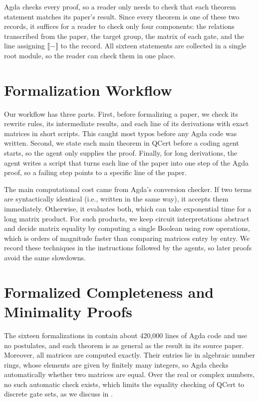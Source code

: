 \documentclass[acmsmall,nonacm,11pt,screen]{acmart}
\begin{document}
Agda checks every proof, so a reader only needs to check that each theorem statement matches its paper's result. Since every theorem is one of these two records, it suffices for a reader to check only four components: the relations transcribed from the paper, the target group, the matrix of each gate, and the line assigning $\llbracket - \rrbracket$ to the record. All sixteen statements are collected in a single root module, so the reader can check them in one place.

\section{Formalization Workflow}\label{sec:method}

Our workflow has three parts. First, before formalizing a paper, we check its rewrite rules, its intermediate results, and each line of its derivations with exact matrices in short scripts. This caught most typos before any Agda code was written. Second, we state each main theorem in QCert before a coding agent starts, so the agent only supplies the proof. Finally, for long derivations, the agent writes a script that turns each line of the paper into one step of the Agda proof, so a failing step points to a specific line of the paper. 

The main computational cost came from Agda's conversion checker. If two terms are syntactically identical (i.e., written in the same way), it accepts them immediately. Otherwise, it evaluates both, which can take exponential time for a long matrix product. For such products, we keep circuit interpretations abstract and decide matrix equality by computing a single Boolean using row operations, which is orders of magnitude faster than comparing matrices entry by entry. We record these techniques in the instructions followed by the agents, so later proofs avoid the same slowdowns.

\section{Formalized Completeness and Minimality Proofs}\label{sec:corpus}

The sixteen formalizations in  contain about 420{,}000 lines of Agda code and use no postulates, and each theorem is as general as the result in its source paper. Moreover, all matrices are computed exactly. Their entries lie in algebraic number rings, whose elements are given by finitely many integers, so Agda checks automatically whether two matrices are equal. Over the real or complex numbers, no such automatic check exists, which limits the equality checking of QCert to discrete gate sets, as we discuss in .
\end{document}
